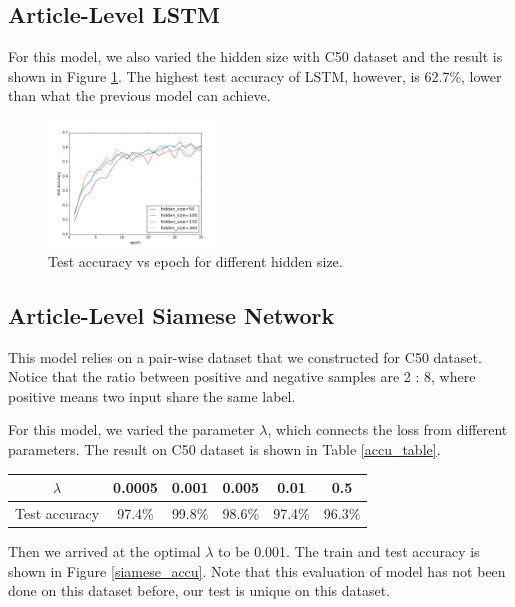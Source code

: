 \documentclass{article} %
\begin{document}
\subsection{Article-Level LSTM}
For this model, we also varied the hidden size with C50 dataset and the result is shown in Figure \ref{lstm_hs}. The highest test accuracy of LSTM, however, is 62.7\%, lower than what the previous model can achieve. 
\begin{figure}[H]
\centering
\includegraphics[width=0.4\textwidth]{figures/epoch_test_accu_lstm_c50.png} 
\caption{Test accuracy vs epoch for different hidden size.}
\label{lstm_hs}
\end{figure}

\subsection{Article-Level Siamese Network}

This model relies on a pair-wise dataset that we constructed for C50 dataset. Notice that the ratio between positive and negative samples are 2 : 8, where positive means two input share the same label.

For this model, we varied the parameter $\lambda$, which connects the loss from different parameters. The result on C50 dataset is shown in Table \ref{accu_table}. 

\begin{center}
\begin{tabular}{ |c|c|c|c|c|c| } 
 \hline
 $\lambda$ & 0.0005 &0.001 & 0.005 & 0.01 & 0.5\\
  \hline
 Test accuracy & 97.4\% & 99.8\% & 98.6\% &  97.4\% & 96.3\%  \\ 
 \hline
\end{tabular}
\label{accu_table}
\end{center}

Then we arrived at the optimal $\lambda$ to be 0.001. The train and test accuracy is shown in Figure \ref{siamese_accu}. Note that this evaluation of model has not been done on this dataset before, our test is unique on this dataset. 
\end{document}

